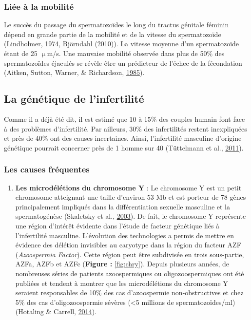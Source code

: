\documentclass[12pt,twoside]{reedthesis}
\providecommand{\tightlist}{%
  \setlength{\itemsep}{0pt}\setlength{\parskip}{0pt}}
\theoremstyle{definition}
\theoremstyle{definition}
\theoremstyle{remark}
\begin{document}
  \subsubsection{Liée à la mobilité}\label{liee-a-la-mobilite}
  
  Le succès du passage du spermatozoïdes le long du tractus génitale
  féminin dépend en grande partie de la mobilité et de la vitesse du
  spermatozoïde (Lindholmer, \protect\hyperlink{ref-Lindholmer1974}{1974},
  Björndahl (\protect\hyperlink{ref-Bjorndahl2010}{2010})). La vitesse
  moyenne d'un spermatozoïde étant de 25 \(\upmu\)m/s. Une mauvaise
  mobilité observée dans plus de 50\% des spermatozoïdes éjaculés se
  révèle être un prédicteur de l'échec de la fécondation (Aitken, Sutton,
  Warner, \& Richardson, \protect\hyperlink{ref-Aitken1985}{1985}).
  
  \subsection{La génétique de
  l'infertilité}\label{la-genetique-de-linfertilite}
  
  Comme il a déjà été dit, il est estimé que 10 à 15\% des couples humain
  font face à des problèmes d'infertilité. Par ailleurs, 30\% des
  infertilités restent inexpliquées et près de 40\% ont des causes
  incertaines. Ainsi, l'infertilité masculine d'origine génétique pourrait
  concerner près de 1 homme sur 40 (Tüttelmann et al.,
  \protect\hyperlink{ref-Tuttelmann2011}{2011}).
  
  \subsubsection{Les causes fréquentes}\label{les-causes-frequentes}
  
  \begin{enumerate}
  \def\labelenumi{\arabic{enumi}.}
  \tightlist
  \item
    \textbf{Les microdélétions du chromosome Y} : Le chromosome Y est un
    petit chromosome atteignant une taille d'environ 53 Mb et est porteur
    de 78 gènes principalement impliqués dans la différentiation sexuelle
    masculine et la spermatogénèse (Skaletsky et al.,
    \protect\hyperlink{ref-Skaletsky2003}{2003}). De fait, le chromosome Y
    représente une région d'intérêt évidente dans l'étude de facteur
    génétique liés à l'infertilité masculine. L'évolution des technologies
    a permis de mettre en évidence des délétion invisibles au caryotype
    dans la région du facteur AZF (\emph{Azoospermia Factor}). Cette
    région peut être subdivisée en trois sous-partie, AZFa, AZFb et AZFc
    (\textbf{Figure :} \ref{fig:chry}). Depuis plusieurs années, de
    nombreuses séries de patients azoospermiques ou oligozoospermiques ont
    été publiées et tendent à montrer que les microdélétions du chromosome
    Y seraient responsables de 10\% des cas d'azoospermie non-obstructives
    et chez 5\% des cas d'oligozoospermie sévères (\textless{}5 millions
    de spermatozoïdes/ml) (Hotaling \& Carrell,
    \protect\hyperlink{ref-Hotaling2014}{2014}).
  \end{enumerate}
  
\end{document}
